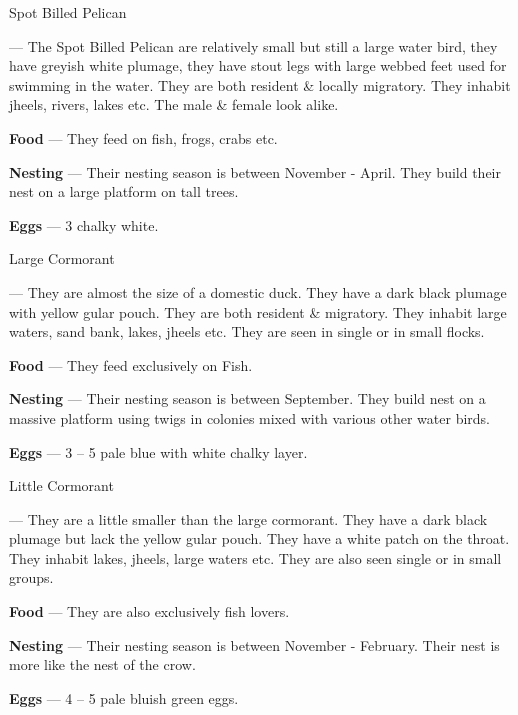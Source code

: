 \begin{bird}{Spot Billed Pelican}

 --- The Spot Billed Pelican are relatively small but still a large water bird, they have greyish white plumage, they have  stout legs with large webbed feet used for swimming in the water. They are both resident \& locally migratory. They inhabit jheels, rivers, lakes etc. The male \& female look alike. 

{\large\bf Food} --- They feed on fish, frogs, crabs etc.

{\large\bf Nesting} --- Their nesting season is between November - April. They build their nest on a large platform on tall trees.

{\large\bf Eggs} --- 3 chalky white.
\end{bird}

\newpage

\begin{bird}{Large Cormorant}

 --- They are almost the size of a domestic duck. They have a dark black plumage with yellow gular pouch. They are both resident \& migratory. They inhabit large waters, sand bank, lakes, jheels etc. They are seen in single or in small flocks.

{\large\bf Food} --- They feed exclusively on Fish.

{\large\bf Nesting} --- Their nesting season is between September. They build nest on a massive platform using twigs in colonies mixed with various other water birds. 

{\large\bf Eggs} --- 3 -- 5 pale blue with white chalky layer. 
\end{bird}

\begin{bird}{Little Cormorant}

 --- They are a little smaller than the large cormorant. They have a dark black plumage but lack the yellow gular pouch. They have a white patch on the throat. They inhabit lakes, jheels, large waters etc. They are also seen single or in small groups. 

{\large\bf Food} --- They are also exclusively fish lovers.

{\large\bf Nesting} --- Their nesting season is between November - February. Their nest is more like the nest of the crow. 

{\large\bf Eggs} --- 4 -- 5 pale bluish green eggs.
\end{bird}

